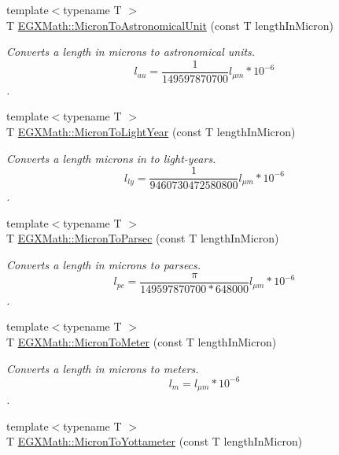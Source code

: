 \begin{DoxyCompactItemize}
\item 
{\footnotesize template$<$typename T $>$ }\\T \mbox{\hyperlink{group___e_g_x_math-_conversions-_length_conversions-_non-_s_i-_micron-_astronomical_ga2d3ebedddec3a5a3a84405f466a6b6d6}{E\+G\+X\+Math\+::\+Micron\+To\+Astronomical\+Unit}} (const T length\+In\+Micron)
\begin{DoxyCompactList}\small\item\em Converts a length in microns to astronomical units. \[ l_{au}= \frac{1}{149597870700} l_{\mu m} * 10^{-6} \]. \end{DoxyCompactList}\item 
{\footnotesize template$<$typename T $>$ }\\T \mbox{\hyperlink{group___e_g_x_math-_conversions-_length_conversions-_non-_s_i-_micron-_astronomical_ga34ef31b495ba7e34c7b92f43e0cd41a6}{E\+G\+X\+Math\+::\+Micron\+To\+Light\+Year}} (const T length\+In\+Micron)
\begin{DoxyCompactList}\small\item\em Converts a length microns in to light-\/years. \[ l_{ly}= \frac{1}{9460730472580800} l_{\mu m} * 10^{-6} \]. \end{DoxyCompactList}\item 
{\footnotesize template$<$typename T $>$ }\\T \mbox{\hyperlink{group___e_g_x_math-_conversions-_length_conversions-_non-_s_i-_micron-_astronomical_gae4a055a8e8b4856c9ac65fb7b2b7a724}{E\+G\+X\+Math\+::\+Micron\+To\+Parsec}} (const T length\+In\+Micron)
\begin{DoxyCompactList}\small\item\em Converts a length in microns to parsecs. \[ l_{pc}=\frac{\pi}{149597870700 * 648000} l_{\mu m} * 10^{-6} \]. \end{DoxyCompactList}\item 
{\footnotesize template$<$typename T $>$ }\\T \mbox{\hyperlink{group___e_g_x_math-_conversions-_length_conversions-_non-_s_i-_micron-_s_i_gacbe71c60e4b4c0c2aebab6dbbe4b35c0}{E\+G\+X\+Math\+::\+Micron\+To\+Meter}} (const T length\+In\+Micron)
\begin{DoxyCompactList}\small\item\em Converts a length in microns to meters. \[ l_{m}=l_{\mu m} * 10^{-6} \]. \end{DoxyCompactList}\item 
{\footnotesize template$<$typename T $>$ }\\T \mbox{\hyperlink{group___e_g_x_math-_conversions-_length_conversions-_non-_s_i-_micron-_s_i_ga3510e5db7988e1fcaece5215a08eb485}{E\+G\+X\+Math\+::\+Micron\+To\+Yottameter}} (const T length\+In\+Micron)

\end{DoxyCompactItemize}
